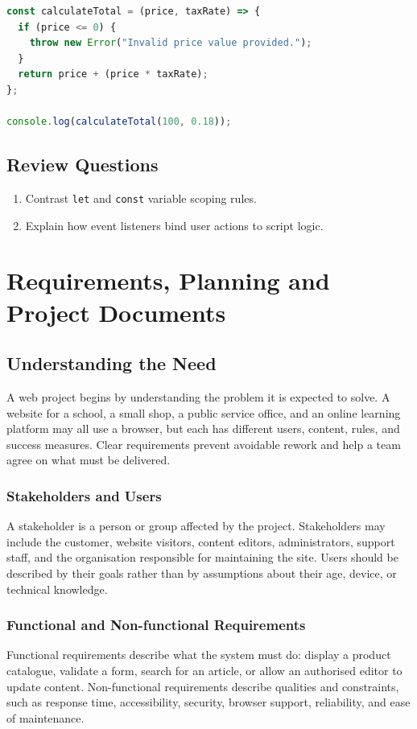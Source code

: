 \documentclass[11pt,openany,oneside]{book}
\begin{document}
\begin{lstlisting}[style=webcode,language=JavaScript]
const calculateTotal = (price, taxRate) => {
  if (price <= 0) {
    throw new Error("Invalid price value provided.");
  }
  return price + (price * taxRate);
};

console.log(calculateTotal(100, 0.18));
\end{lstlisting}

\section*{Review Questions}
\begin{enumerate}
\item Contrast \texttt{let} and \texttt{const} variable scoping rules.
\item Explain how event listeners bind user actions to script logic.
\end{enumerate}



\chapter{Requirements, Planning and Project Documents}
\section{Understanding the Need}
A web project begins by understanding the problem it is expected to solve. A website for a school, a small shop, a public service office, and an online learning platform may all use a browser, but each has different users, content, rules, and success measures. Clear requirements prevent avoidable rework and help a team agree on what must be delivered.

\subsection{Stakeholders and Users}
A stakeholder is a person or group affected by the project. Stakeholders may include the customer, website visitors, content editors, administrators, support staff, and the organisation responsible for maintaining the site. Users should be described by their goals rather than by assumptions about their age, device, or technical knowledge.

\subsection{Functional and Non-functional Requirements}
Functional requirements describe what the system must do: display a product catalogue, validate a form, search for an article, or allow an authorised editor to update content. Non-functional requirements describe qualities and constraints, such as response time, accessibility, security, browser support, reliability, and ease of maintenance.
\end{document}
